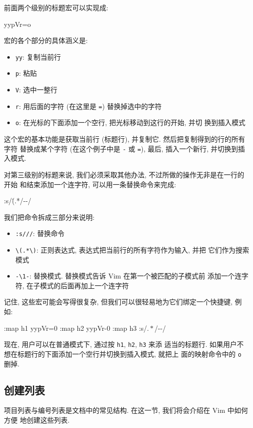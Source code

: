 前面两个级别的标题宏可以实现成:
\begin{vimcode}
yypVr=o
\end{vimcode}
宏的各个部分的具体涵义是:
\begin{itemize}
    \item \texttt{yy}: 复制当前行
    \item \texttt{p}: 粘贴
    \item \texttt{V}: 选中一整行
    \item \texttt{r}: 用后面的字符 (在这里是 \texttt{=}) 替换掉选中的字符
    \item \texttt{o}: 在光标的下面添加一个空行, 把光标移动到这行的开始, 并切
        换到插入模式
\end{itemize}

这个宏的基本功能是获取当前行 (标题行), 并复制它. 然后把复制得到的行的所有字符
替换成某个字符 (在这个例子中是 \texttt{-} 或 \texttt{=}), 最后, 插入一个新行,
并切换到插入模式.

对第三级别的标题来说, 我们必须采取其他办法, 不过所做的操作无非是在一行的开始
和结束添加一个连字符, 可以用一条替换命令来完成:
\begin{vimcode}
:s/\.(.*\)/-\1-/
\end{vimcode}
我们把命令拆成三部分来说明:
\begin{itemize}
    \item \texttt{:s///}: 替换命令
    \item \verb'\(.*\)': 正则表达式, 表达式把当前行的所有字符作为输入, 并把
        它们作为搜索模式
    \item \verb'-\1-': 替换模式. 替换模式告诉 Vim 在第一个被匹配的子模式前
        添加一个连字符, 在子模式的后面再加上一个连字符
\end{itemize}

记住, 这些宏可能会写得很复杂, 但我们可以很轻易地为它们绑定一个快捷键, 例如:
\begin{vimcode}
:map h1 yypVr=0
:map h2 yypVr-0
:map h3 :s/\(.*\)/-\1-/
\end{vimcode}
现在, 用户可以在普通模式下, 通过按 \texttt{h1}, \texttt{h2}, \texttt{h3} 来添
适当的标题行. 如果用户不想在标题行的下面添加一个空行并切换到插入模式, 就把上
面的映射命令中的 \texttt{o} 删掉.

\subsection{创建列表}
\label{subsec:creating_lists}

项目列表与编号列表是文档中的常见结构. 在这一节, 我们将会介绍在 Vim 中如何方便
地创建这些列表.

